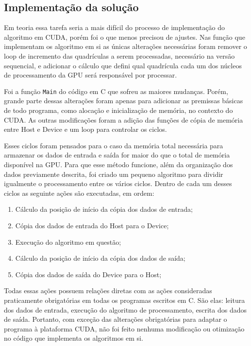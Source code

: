 \subsection{Implementação da solução}\label{cap:implementacao_solucao}

Em teoria essa tarefa seria a mais difícil do processo de implementação do algoritmo em CUDA, porém foi o que menos precisou de ajustes. Nas função que implementam os algoritmo em si as únicas alterações necessárias foram remover o loop de incremento das quadrículas a serem processadas, necessário na versão sequencial, e adicionar o cálculo que defini qual quadrícula cada um dos núcleos de processamento da GPU será responsável por processar.

Foi a função \texttt{Main} do código em C que sofreu as maiores mudanças. Porém, grande parte dessas alterações foram apenas para adicionar as premissas básicas de todo programa, como alocação e inicialização de memória, no contexto do CUDA. As outras modificações foram a adição das funções de cópia de memória entre Host e Device e um loop para controlar os ciclos.

Esses ciclos foram pensados para o caso da memória total necessária para armazenar os dados de entrada e saída for maior do que o total de memória disponível na GPU. Para que esse método funcione, além da organização dos dados previamente descrita, foi criado um pequeno algoritmo para dividir igualmente o processamento entre os vários ciclos. Dentro de cada um desses ciclos as seguinte ações são executadas, em ordem:

\begin{enumerate}
\item Cálculo da posição de início da cópia dos dados de entrada;
\item Cópia dos dados de entrada do Host para o Device;
\item Execução do algoritmo em questão;
\item Cálculo da posição de início da cópia dos dados de saída;
\item Cópia dos dados de saída do Device para o Host;
\end{enumerate}

Todas essas ações possuem relações diretas com as ações consideradas praticamente obrigatórias em todas os programas escritos em C. São elas: leitura dos dados de entrada, execução do algoritmo de processamento, escrita dos dados de saída. Portanto, com exceção das alterações obrigatórias para adaptar o programa à plataforma CUDA, não foi feito nenhuma modificação ou otimização no código que implementa os algoritmos em si.

